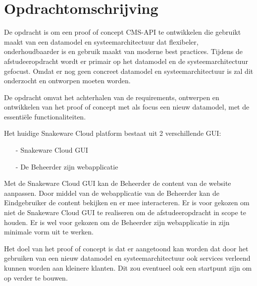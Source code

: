 \section{Opdrachtomschrijving}
\label{sec:Opdrachtomschrijving}
De opdracht is om een proof of concept CMS-API te ontwikkelen die gebruikt maakt van een datamodel en systeemarchitectuur dat flexibeler, onderhoudbaarder is en gebruik maakt van moderne best practices.
Tijdens de afstudeeropdracht wordt er primair op het datamodel en de systeemarchitectuur gefocust.
Omdat er nog geen concreet datamodel en systeemarchitectuur is zal dit onderzocht en ontworpen moeten worden.

\whitespace[2]
De opdracht omvat het achterhalen van de requirements, ontwerpen en ontwikkelen van het proof of concept met als focus een nieuw datamodel, met de essentiële functionaliteiten.

\whitespace[2]
Het huidige Snakeware Cloud platform bestaat uit 2 verschillende \gls{GUI}:
\begin{itemize}
	\item[-] Snakeware Cloud \gls{GUI}
    \item[-] De \gls{Beheerder} zijn webapplicatie
\end{itemize}

\whitespace
Met de Snakeware Cloud \gls{GUI} kan de \gls{Beheerder} de content van de website aanpassen.
Door middel van de webapplicatie van de \gls{Beheerder} kan de \gls{Eindgebruiker} de content bekijken en er mee interacteren.
Er is voor gekozen om niet de Snakeware Cloud \gls{GUI} te realiseren om de afstudeeropdracht in scope te houden.
Er is wel voor gekozen om de \gls{Beheerder} zijn webapplicatie in zijn minimale vorm uit te werken.

\whitespace[2]
Het doel van het proof of concept is dat er aangetoond kan worden dat door het gebruiken van een nieuw datamodel en systeemarchitectuur ook services verleend kunnen worden aan kleinere klanten.
Dit zou eventueel ook een startpunt zijn om op verder te bouwen.
%
